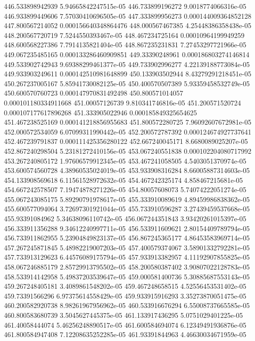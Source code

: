 {446.533898942939 5.94665842247515e-05
446.733899196272 9.0018774066316e-05
446.933899449606 7.57030410696505e-05
447.333899956273 0.000144009364852128
447.800567214052 0.000156640348864476
448.000567467385 4.25448386358438e-05
448.200567720719 7.5244550393467e-05
448.467234725164 0.00010964199949259
448.600568227386 7.7914135821404e-05
448.867235231831 7.27453297721966e-05
449.067235485165 0.000133286460909851
449.33390248961 0.000186803274146814
449.533902742943 9.69388299461377e-05
449.733902996277 4.22139188773084e-05
449.933903249611 0.000142510981648899
450.133903502944 8.43279291218451e-05
450.267237005167 5.85941730082125e-05
450.400570507389 5.93359458532749e-05
450.600570760723 0.000147970831492498
450.800571014057 0.000101180334911668
451.00057126739 9.810341746816e-05
451.200571520724 0.000107177617896268
451.333905022946 0.000185849325654625
451.467238525169 0.000141218856955683
451.800572280725 7.96092607672981e-05
452.000572534059 6.07099311990442e-05
452.200572787392 0.000124674927737641
452.467239791837 0.000111425356280122
452.667240045171 8.6680089025207e-05
452.867240298504 5.23181272410156e-05
453.067240551838 0.000102204080717992
453.267240805172 1.97606579912345e-05
453.467241058505 4.5403051370974e-05
453.600574560728 4.38960535024019e-05
453.933908316284 8.66005887314603e-05
454.133908569618 6.11561528972632e-05
454.467242325174 4.858467215681e-05
454.667242578507 7.19474878271226e-05
454.80057608073 5.74074222051274e-05
455.067243085175 5.89290791978617e-05
455.333910089619 4.89459986838362e-05
455.600577094064 3.72697301921044e-05
455.733910596287 3.27439459537668e-05
455.93391084962 5.34638096110742e-05
456.067244351843 3.93420261015397e-05
456.333911356288 9.34612240997711e-05
456.533911609621 2.80154409789794e-05
456.733911862955 5.23904849823137e-05
456.867245365177 4.86453583969714e-05
457.267245871845 5.48982219007203e-05
457.400579374067 3.58901332792281e-05
457.733913129623 6.44576089175794e-05
457.933913382957 4.11192907855825e-05
458.067246885179 2.85729913795502e-05
458.200580387402 3.90807022128783e-05
458.533914142958 5.49837203539647e-05
459.000581400736 5.30885687553143e-05
459.267248405181 3.4089861548202e-05
459.467248658515 4.52556453531402e-05
459.73391566296 6.97375614558429e-05
459.933915916293 3.35273870051475e-05
460.200582920738 8.98261967956962e-05
460.533916676294 6.55008737665585e-05
460.800583680739 3.5045627445375e-05
461.133917436295 5.0751029401225e-05
461.40058444074 5.46256248890517e-05
461.600584694074 6.12349491936876e-05
461.800584947408 7.12208635252285e-05
461.93391844963 4.46630034671959e-05
}
